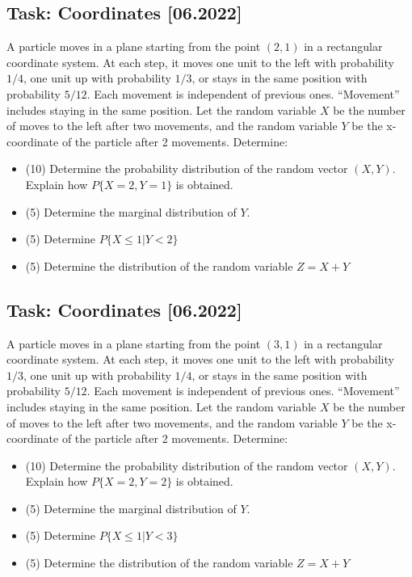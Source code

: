 \documentclass[a4paper, 12pt]{article}
\begin{document}
\subsection*{Task: Coordinates [06.2022]}

A particle moves in a plane starting from the point $(2, 1)$ in a rectangular coordinate system. At each step, it moves one unit to the left with probability $1/4$, one unit up with probability $1/3$, or stays in the same position with probability $5/12$. Each movement is independent of previous ones. “Movement” includes staying in the same position. Let the random variable $X$ be the number of moves to the left after two movements, and the random variable $Y$ be the x-coordinate of the particle after 2 movements. Determine:

\begin{itemize}
   \item [a)] (10) Determine the probability distribution of the random vector $(X, Y)$. Explain how $P\{X = 2, Y = 1\}$ is obtained.
   \item [b)] (5) Determine the marginal distribution of $Y$.
   \item [c)] (5) Determine $P\{X \leq 1 | Y < 2\}$
   \item [d)] (5) Determine the distribution of the random variable $Z = X + Y$
\end{itemize}


\subsection*{Task: Coordinates [06.2022]}

A particle moves in a plane starting from the point $(3, 1)$ in a rectangular coordinate system. At each step, it moves one unit to the left with probability $1/3$, one unit up with probability $1/4$, or stays in the same position with probability $5/12$. Each movement is independent of previous ones. “Movement” includes staying in the same position. Let the random variable $X$ be the number of moves to the left after two movements, and the random variable $Y$ be the x-coordinate of the particle after 2 movements. Determine:

\begin{itemize}
   \item [a)] (10) Determine the probability distribution of the random vector $(X, Y)$. Explain how $P\{X = 2, Y = 2\}$ is obtained.
   \item [b)] (5) Determine the marginal distribution of $Y$.
   \item [c)] (5) Determine $P\{X \leq 1 | Y < 3\}$
   \item [d)] (5) Determine the distribution of the random variable $Z = X + Y$
\end{itemize}
\end{document}
